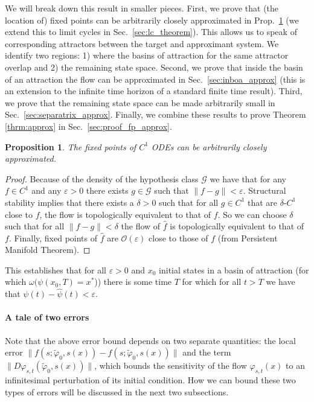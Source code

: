 \documentclass{article}
\newtheorem{proposition}{Proposition}
\theoremstyle{definition} \newtheorem{definition}{Definition}
\theoremstyle{remark} \newtheorem{remark}{Remark}
\newcounter{ct}
\begin{document}
We will break down this result in smaller pieces. 
First, we prove that (the location of) fixed points can be arbitrarily closely approximated in Prop.~\ref{prop:fp_approx} (we extend this to limit cycles in Sec.~\ref{sec:lc_theorem}).
This allows us to speak of corresponding attractors between the target and approximant system.
We identify two regions: 1) where the basins of attraction for the same attractor overlap and 2) the remaining state space.
Second, we prove that inside the basin of an attraction the flow can be approximated in Sec.~\ref{sec:inboa_approx} (this is an extension to the infinite time horizon of a standard finite time result). %
Third, we prove that the remaining state space can be made arbitrarily small in Sec.~\ref{sec:separatrix_approx}.
Finally, we combine these results to prove Theorem \ref{thrm:approx} in Sec.~\ref{sec:proof_fp_approx}.

\begin{proposition}\label{prop:fp_approx}
The fixed points of $C^1$ ODEs can be arbitrarily closely approximated. %
\end{proposition}

\begin{proof}
Because of the density of the hypothesis class $\mathcal{G}$ we have that for any $f\in C^1$ and any $\varepsilon>0$
there exists $g\in\mathcal{G}$ such that $\|f-g\|<\varepsilon$.
%
Structural stability implies that there exists a $\delta>0$ such that for all $g\in C^1$ that are $\delta$-$C^1$ close to $f$, the flow is topologically equivalent to that of $f$.
So we can choose $\delta$ such that for all $\|f-g\|<\delta$ the flow of $\hat f$ is topologically equivalent to that of $f$.
Finally, fixed points of $\hat f$ are $\mathcal{O}(\varepsilon)$ close to those of $f$ (from Persistent Manifold Theorem\cite{jones1995gspt}).
\end{proof}

This establishes that for all $\varepsilon>0$ and $x_0$ initial states in a basin of attraction (for which $\omega (\psi(x_0,T) = x^*$)) there is some time $T$ for which for all $t>T$ we have that $\psi(t)-\hat \psi(t)<\varepsilon$.


\paragraph{A tale of two errors}
Note that the above error bound depends on two separate quantities: the local error 
$\| f(s; \tilde{\varphi}_0, s(x)) - f(s; \tilde{\varphi}_0, s(x)) \|$ 
 and the term 
$\| D\varphi_{s,t}(\tilde{\varphi}_0, s(x)) \|$, 
which bounds the sensitivity of the flow $\varphi_{s,t}(x)$ to an infinitesimal perturbation of its initial condition.
How we can bound these two types of errors will be discussed in the next two subsections.%
\end{document}
